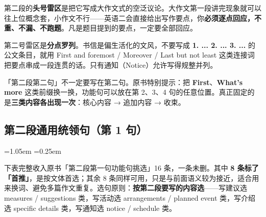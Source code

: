 \documentclass[11pt,a4paper]{ctexart}
\newcommand{\kw}[1]{{\bfseries\color{accent}#1}}
\newcommand{\zone}[1]{\par\addvspace{3pt}\noindent{\bfseries\color{accent}【雷区】}#1\par\addvspace{3pt}}
\newcommand{\tip}[1]{\par\addvspace{3pt}\noindent{\bfseries【提示】}#1\par\addvspace{3pt}}
\newenvironment{note}{%
  \par\addvspace{5pt}%
  \begin{list}{}{\leftmargin=1.05em \rightmargin=0.25em \listparindent=0pt
    \itemindent=0pt \topsep=0pt \parsep=2pt \itemsep=2pt \partopsep=0pt}%
  \item\relax\small\color{ink}%
}{%
  \end{list}\addvspace{5pt}%
}
\begin{document}
\zone{第二段的\textbf{头号雷区}是把它写成大作文式的空泛议论。大作文第一段讲完现象就可以往上位概念套，小作文不行——英语二会直接给出写作要点，你\textbf{必须逐点回应，不重、不漏、不跑题}。凡是题目提到的要点，一定要全部回应。}

\zone{第二号雷区是\textbf{分点罗列}。书信是偏生活化的文风，不要写成 \kw{1. ... 2. ... 3. ...} 的公文条目，就用 First and foremost / Moreover / Last but not least 这类连接词把要点串成一段连贯的话。只有通知（Notice）允许写得规整并列。}

\tip{「第二段第二句」不一定要写在第二句。原书特别提示：把 \kw{First}、\kw{What's more} 这类前缀换一换，功能句可以放在第 2、3、4 句的任意位置。真正固定的是\textbf{三类内容各出现一次}：核心内容 → 追加内容 → 收束。}


\subsection{第二段通用统领句（第 1 句）}

\begin{note}
下表完整收入原书「第二段第一句功能句挑选」16 条，一条未删。其中 \textbf{8 条标了「首推」}，是按文体首选；其余 8 条同样可用，只是与前面语义较为接近，适合用来换词、避免多篇作文重复。选句原则：\textbf{按第二段要写的内容选}——写建议选 measures / suggestions 类，写活动选 arrangements / planned event 类，写介绍选 specific details 类，写通知选 notice / schedule 类。
\end{note}
\end{document}
